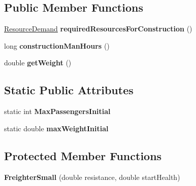 \subsection*{Public Member Functions}
\begin{DoxyCompactItemize}
\item 
\hyperlink{classuniverse_1_1_resource_demand}{Resource\+Demand} {\bfseries required\+Resources\+For\+Construction} ()\hypertarget{classtools_1_1vehicles_1_1space_1_1_freighter_small_a7c588960baaec58610837230f52408da}{}\label{classtools_1_1vehicles_1_1space_1_1_freighter_small_a7c588960baaec58610837230f52408da}

\item 
long {\bfseries construction\+Man\+Hours} ()\hypertarget{classtools_1_1vehicles_1_1space_1_1_freighter_small_ae7cfda7f950e44589b3462dde5ba6505}{}\label{classtools_1_1vehicles_1_1space_1_1_freighter_small_ae7cfda7f950e44589b3462dde5ba6505}

\item 
double {\bfseries get\+Weight} ()\hypertarget{classtools_1_1vehicles_1_1space_1_1_freighter_small_ae935c491562666e5e51ead2bf4a73310}{}\label{classtools_1_1vehicles_1_1space_1_1_freighter_small_ae935c491562666e5e51ead2bf4a73310}

\end{DoxyCompactItemize}
\subsection*{Static Public Attributes}
\begin{DoxyCompactItemize}
\item 
static int {\bfseries Max\+Passengers\+Initial}\hypertarget{classtools_1_1vehicles_1_1space_1_1_freighter_small_ada98326e2fa83d241615345e2c7d0932}{}\label{classtools_1_1vehicles_1_1space_1_1_freighter_small_ada98326e2fa83d241615345e2c7d0932}

\item 
static double {\bfseries max\+Weight\+Initial}\hypertarget{classtools_1_1vehicles_1_1space_1_1_freighter_small_a01a2c769ec2d51b14717235e23dc2657}{}\label{classtools_1_1vehicles_1_1space_1_1_freighter_small_a01a2c769ec2d51b14717235e23dc2657}

\end{DoxyCompactItemize}
\subsection*{Protected Member Functions}
\begin{DoxyCompactItemize}
\item 
{\bfseries Freighter\+Small} (double resistance, double start\+Health)\hypertarget{classtools_1_1vehicles_1_1space_1_1_freighter_small_a0e77fc9e5e60d6d90afe1104030a84e8}{}\label{classtools_1_1vehicles_1_1space_1_1_freighter_small_a0e77fc9e5e60d6d90afe1104030a84e8}

\end{DoxyCompactItemize}
